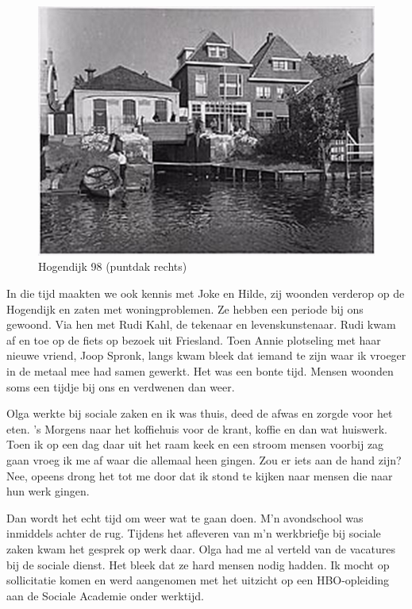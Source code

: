 \documentclass[10pt,twoside, openright]{memoir}
\begin{document}
\begin{figure}
\includegraphics[width=\textwidth]{img/ch41/Hogendijk}
\caption*{\footnotesize Hogendijk 98 (puntdak rechts)}
\end{figure}

In die tijd maakten we ook kennis met Joke en Hilde, zij woonden verderop op de Hogendijk en zaten met woningproblemen. Ze hebben een periode bij ons gewoond. Via hen met Rudi Kahl, de tekenaar en levenskunstenaar. Rudi kwam af en toe op de fiets op bezoek uit Friesland. Toen Annie plotseling met haar nieuwe vriend, Joop Spronk, langs kwam bleek dat iemand te zijn waar ik vroeger in de metaal mee had samen gewerkt. Het was een bonte tijd. Mensen woonden soms een tijdje bij ons en verdwenen dan weer. 

Olga werkte bij sociale zaken en ik was thuis, deed de afwas en zorgde voor het eten. 's Morgens naar het koffiehuis voor de krant, koffie en dan wat huiswerk. Toen ik op een dag daar uit het raam keek en een stroom mensen voorbij zag gaan vroeg ik  me af waar die allemaal heen gingen. Zou er iets aan de hand zijn? Nee, opeens drong het tot me door dat ik stond te kijken naar mensen die naar hun werk gingen. 

Dan wordt het echt tijd om weer wat te gaan doen. M'n avondschool was inmiddels achter de rug. Tijdens het afleveren van m'n werkbriefje bij sociale zaken kwam het gesprek op werk daar. Olga had me al verteld van de vacatures bij de sociale dienst. Het bleek dat ze hard mensen nodig hadden. Ik mocht op sollicitatie komen en werd aangenomen met het uitzicht op een HBO-opleiding aan de Sociale Academie onder werktijd. 
\end{document}

